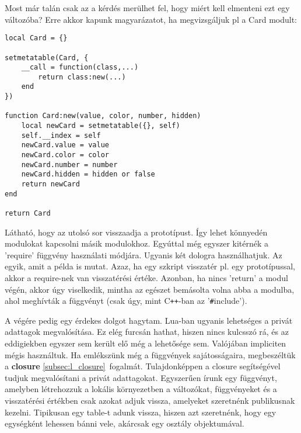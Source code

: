 Most már talán csak az a kérdés merülhet fel, hogy miért kell elmenteni ezt egy változóba? Erre akkor kapunk magyarázatot, ha megvizsgáljuk pl a Card modult:
\newpage
\scriptsize
\begin{lstlisting}
local Card = {}

setmetatable(Card, {
	__call = function(class,...)
		return class:new(...)
	end
})

function Card:new(value, color, number, hidden)
	local newCard = setmetatable({}, self)
	self.__index = self
	newCard.value = value
	newCard.color = color
	newCard.number = number
	newCard.hidden = hidden or false
	return newCard
end

return Card
\end{lstlisting}
\normalsize
Látható, hogy az utolsó sor visszaadja a prototípust. Így lehet könnyedén modulokat kapcsolni másik modulokhoz. Egyúttal még egyszer kitérnék a 'require' függvény használati módjára. Ugyanis két dologra használhatjuk. Az egyik, amit a példa is mutat. Azaz, ha egy szkript visszatér pl. egy prototípussal, akkor a require-nek van visszatérési értéke. Azonban, ha nincs 'return' a modul végén, akkor úgy viselkedik, mintha az egészet bemásolta volna abba a modulba, ahol meghívták a függvényt (csak úgy, mint C\verb|++|-ban az '\verb|#|include').

A végére pedig egy érdekes dolgot hagytam. Lua-ban ugyanis lehetséges a privát adattagok megvalósítása. Ez elég furcsán hathat, hiszen nincs kulcsszó rá, és az eddigiekben egyszer sem került elő még a lehetősége sem. Valójában impliciten mégis használtuk. Ha emlékszünk még a függvények sajátosságaira, megbeszéltük a \textbf{closure} \ref{subsec:l_closure}~fogalmát. Tulajdonképpen a closure segítségével tudjuk megvalósítani a privát adattagokat. Egyszerűen írunk egy függvényt, amelyben létrehozzuk a lokális környezetben a változókat, függvényeket és a visszatérési értékben csak azokat adjuk vissza, amelyeket szeretnénk publikusnak kezelni. Tipikusan egy table-t adunk vissza, hiszen azt szeretnénk, hogy egy egységként lehessen bánni vele, akárcsak egy osztály objektumával.

